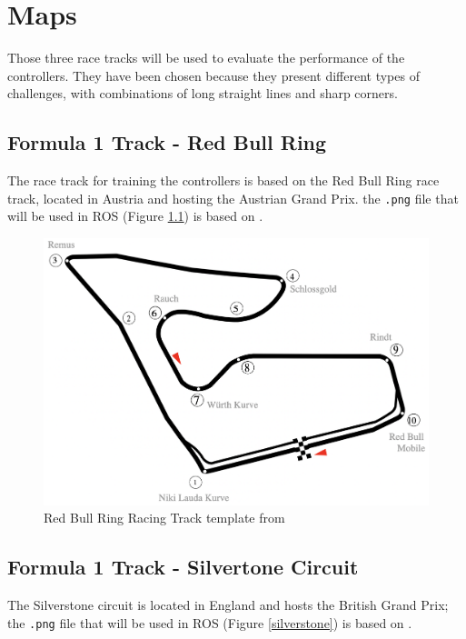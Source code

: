 
\chapter{Maps} %

\label{AppendixA} %


Those three race tracks will be used to evaluate the performance of the controllers. They have been chosen because they present different types of challenges, with combinations of long straight lines and sharp corners.

\section{Formula 1 Track - Red Bull Ring}
The race track for training the controllers is based on the Red Bull Ring race track, located in Austria and hosting the Austrian Grand Prix. the \verb |.png| file that will be used in ROS (Figure \ref{redbull}) is based on \cite{wikiredbull}.

\begin{figure}[H]
\centering
\includegraphics[scale=0.3]{Figures/redbull.png}
\caption{Red Bull Ring Racing Track template from \cite{wikiredbull}}
\label{redbull}
\end{figure}

\section{Formula 1 Track - Silvertone Circuit}
The Silverstone circuit is located in England and hosts the British Grand Prix; the \verb |.png| file that will be used in ROS (Figure \ref{silverstone}) is based on \cite{wikisilver}.

